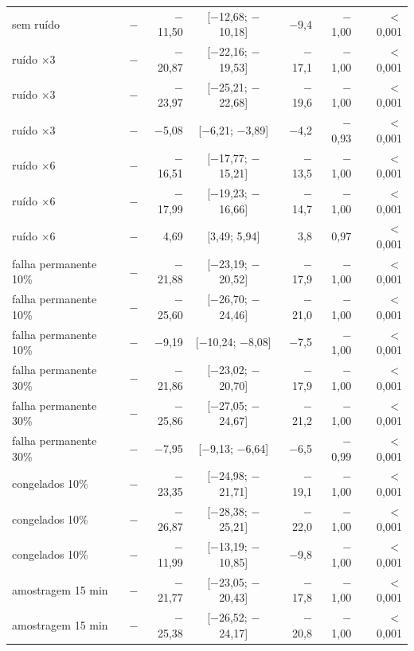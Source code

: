 \begin{tabular}{@{}llrcrrr@{}}
sem ruído & \polD{} $-$ \polA{} & $-$11,50 & [$-$12,68; $-$10,18] & $-$9,4 & $-$1,00 & $<$0,001 \\
ruído $\times$3 & \polBOR{} $-$ \polA{} & $-$20,87 & [$-$22,16; $-$19,53] & $-$17,1 & $-$1,00 & $<$0,001 \\
ruído $\times$3 & \polC{} $-$ \polA{} & $-$23,97 & [$-$25,21; $-$22,68] & $-$19,6 & $-$1,00 & $<$0,001 \\
ruído $\times$3 & \polD{} $-$ \polA{} & $-$5,08 & [$-$6,21; $-$3,89] & $-$4,2 & $-$0,93 & $<$0,001 \\
ruído $\times$6 & \polBOR{} $-$ \polA{} & $-$16,51 & [$-$17,77; $-$15,21] & $-$13,5 & $-$1,00 & $<$0,001 \\
ruído $\times$6 & \polC{} $-$ \polA{} & $-$17,99 & [$-$19,23; $-$16,66] & $-$14,7 & $-$1,00 & $<$0,001 \\
ruído $\times$6 & \polD{} $-$ \polA{} & 4,69 & [3,49; 5,94] & 3,8 & 0,97 & $<$0,001 \\
falha permanente 10\% & \polBOR{} $-$ \polA{} & $-$21,88 & [$-$23,19; $-$20,52] & $-$17,9 & $-$1,00 & $<$0,001 \\
falha permanente 10\% & \polC{} $-$ \polA{} & $-$25,60 & [$-$26,70; $-$24,46] & $-$21,0 & $-$1,00 & $<$0,001 \\
falha permanente 10\% & \polD{} $-$ \polA{} & $-$9,19 & [$-$10,24; $-$8,08] & $-$7,5 & $-$1,00 & $<$0,001 \\
falha permanente 30\% & \polBOR{} $-$ \polA{} & $-$21,86 & [$-$23,02; $-$20,70] & $-$17,9 & $-$1,00 & $<$0,001 \\
falha permanente 30\% & \polC{} $-$ \polA{} & $-$25,86 & [$-$27,05; $-$24,67] & $-$21,2 & $-$1,00 & $<$0,001 \\
falha permanente 30\% & \polD{} $-$ \polA{} & $-$7,95 & [$-$9,13; $-$6,64] & $-$6,5 & $-$0,99 & $<$0,001 \\
congelados 10\% & \polBOR{} $-$ \polA{} & $-$23,35 & [$-$24,98; $-$21,71] & $-$19,1 & $-$1,00 & $<$0,001 \\
congelados 10\% & \polC{} $-$ \polA{} & $-$26,87 & [$-$28,38; $-$25,21] & $-$22,0 & $-$1,00 & $<$0,001 \\
congelados 10\% & \polD{} $-$ \polA{} & $-$11,99 & [$-$13,19; $-$10,85] & $-$9,8 & $-$1,00 & $<$0,001 \\
amostragem 15 min & \polBOR{} $-$ \polA{} & $-$21,77 & [$-$23,05; $-$20,43] & $-$17,8 & $-$1,00 & $<$0,001 \\
amostragem 15 min & \polC{} $-$ \polA{} & $-$25,38 & [$-$26,52; $-$24,17] & $-$20,8 & $-$1,00 & $<$0,001 \\

\end{tabular}
